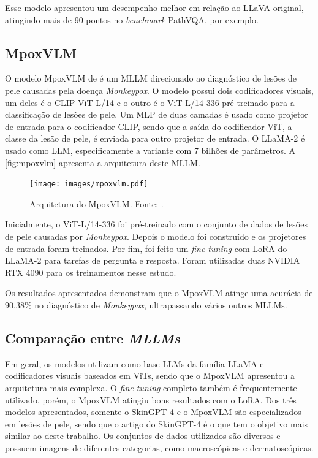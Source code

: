 Esse modelo apresentou um desempenho melhor em relação ao \ac{LLaVA} original, atingindo mais de 90 pontos no \textit{benchmark} PathVQA, por exemplo.

\subsection{MpoxVLM}

O modelo MpoxVLM de \textcite{cao2024mpoxvlm} é um \ac{MLLM} direcionado ao diagnóstico de lesões de pele causadas pela doença \textit{Monkeypox}. O modelo possui dois
codificadores visuais, um deles é o \ac{CLIP} \ac{ViT}-L/14 e o outro é o \ac{ViT}-L/14-336 pré-treinado para a classificação de lesões de pele. Um \ac{MLP} de duas camadas
é usado como projetor de entrada para o codificador \ac{CLIP}, sendo que a saída do codificador \ac{ViT}, a classe da lesão de pele, é enviada para outro projetor de
entrada. O \ac{LLaMA}-2 é usado como \ac{LLM}, especificamente a variante com 7 bilhões de parâmetros. A \autoref{fig:mpoxvlm} apresenta a arquitetura deste \ac{MLLM}.

\begin{figure}[ht]
    \centering
    \texttt{[image: images/mpoxvlm.pdf]}
    \caption{\small Arquitetura do MpoxVLM. Fonte: \textcite{cao2024mpoxvlm}.}
    \label{fig:mpoxvlm}
\end{figure}

Inicialmente, o \ac{ViT}-L/14-336 foi pré-treinado com o conjunto de dados de lesões de pele causadas por \textit{Monkeypox}. Depois o modelo foi construído e os
projetores de entrada foram treinados. Por fim, foi feito um \textit{fine-tuning} com \ac{LoRA} do \ac{LLaMA}-2 para tarefas de pergunta e resposta. Foram utilizadas
duas NVIDIA RTX 4090 para os treinamentos nesse estudo.

Os resultados apresentados demonstram que o MpoxVLM atinge uma acurácia de 90,38\% no diagnóstico de \textit{Monkeypox}, ultrapassando vários outros \acp{MLLM}.

\subsection{Comparação entre \textit{MLLMs}} %

Em geral, os modelos utilizam como base \acp{LLM} da família \ac{LLaMA} e codificadores visuais baseados em \acp{ViT}, sendo que o MpoxVLM apresentou a arquitetura
mais complexa. O \textit{fine-tuning} completo também é frequentemente utilizado, porém, o MpoxVLM atingiu bons resultados com o \ac{LoRA}. Dos três modelos apresentados,
somente o Skin\ac{GPT}-4 e o MpoxVLM são especializados em lesões de pele, sendo que o artigo do Skin\ac{GPT}-4 é o que tem o objetivo mais similar ao deste trabalho. Os
conjuntos de dados utilizados são diversos e possuem imagens de diferentes categorias, como macroscópicas e dermatoscópicas.

